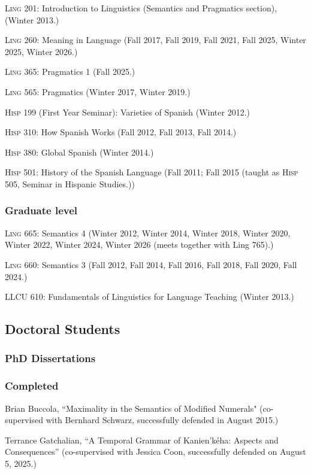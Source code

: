 \documentclass[11pt]{article}
\begin{document}
\textsc{Ling} 201: Introduction to Linguistics (Semantics and Pragmatics
section), (Winter 2013.)

\textsc{Ling} 260: Meaning in Language (Fall 2017, Fall 2019, Fall 2021, Fall 2025, Winter 2025, Winter 2026.)

\textsc{Ling} 365: Pragmatics 1 (Fall 2025.)

\textsc{Ling} 565: Pragmatics (Winter 2017, Winter 2019.)

\textsc{Hisp} 199 (First Year Seminar): Varieties of Spanish (Winter 2012.)

\textsc{Hisp} 310: How Spanish Works (Fall 2012, Fall 2013, Fall 2014.)

\textsc{Hisp} 380: Global Spanish (Winter 2014.)

\textsc{Hisp} 501: History of the Spanish Language (Fall 2011; Fall 2015 (taught as \textsc{Hisp} 505, Seminar in Hispanic Studies.))



\subsubsection*{Graduate level}

\textsc{Ling} 665: Semantics 4 (Winter 2012, Winter 2014, Winter 2018, Winter 2020, Winter 2022, Winter 2024, Winter 2026 (meets together with
Ling 765).)

\textsc{Ling} 660: Semantics 3 (Fall 2012, Fall 2014, Fall 2016, Fall 2018, Fall 2020, Fall 2024.)

LLCU 610: Fundamentals of Linguistics for Language Teaching (Winter 2013.)


\subsection*{Doctoral Students}


\subsubsection*{PhD Dissertations}


\subsubsection*{Completed}

Brian Buccola, ``Maximality in the Semantics of Modified Numerals" (co-supervised with Bernhard Schwarz, successfully defended in August 2015.)

Terrance Gatchalian, ``A Temporal Grammar of Kanien'k\'{e}ha: Aspects and Consequences'' (co-supervised with Jessica Coon, successfully defended on August 5, 2025.)
\end{document}
